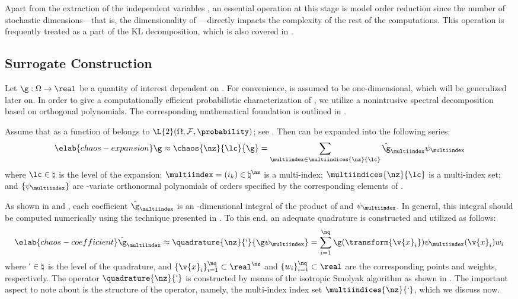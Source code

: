 Apart from the extraction of the independent variables \vz, an essential
operation at this stage is model order reduction since the number of stochastic
dimensions---that is, the dimensionality of \vz---directly impacts the
complexity of the rest of the computations. This operation is frequently treated
as a part of the \ac{KL} decomposition, which is also covered in
.

\subsection{Surrogate Construction}

Let $\g: \Omega \to \real$ be a quantity of interest dependent on \vu. For
convenience, \g is assumed to be one-dimensional, which will be generalized
later on. In order to give a computationally efficient probabilistic
characterization of \g, we utilize a nonintrusive spectral decomposition based
on orthogonal polynomials. The corresponding mathematical foundation is outlined
in .

Assume that \g as a function of \vu belongs to $\L{2}(\Omega, \mathcal{F},
\probability)$; see . Then \g can be expanded into the
following series:
\begin{equation} \elab{chaos-expansion}
  \g \approx \chaos{\nz}{\lc}{\g} = \sum_{\multiindex \in \multiindices{\nz}{\lc}} \hat{\g}_{\multiindex} \psi_{\multiindex}
\end{equation}
where $\lc \in \natural$ is the level of the expansion; $\multiindex = (i_k) \in
\natural^\nz$ is a multi-index; $\multiindices{\nz}{\lc}$ is a multi-index set;
and $\{ \psi_{\multiindex} \}$ are \nz-variate orthonormal polynomials of orders
specified by the corresponding elements of \multiindex.

As shown in  and , each
coefficient $\hat{\g}_{\multiindex}$ is an \nz-dimensional integral of the
product of \g and $\psi_{\multiindex}$. In general, this integral should be
computed numerically using the technique presented in
. To this end, an adequate quadrature is constructed
and utilized as follows:
\begin{equation} \elab{chaos-coefficient}
  \hat{\g}_{\multiindex} \approx \quadrature{\nz}{\lq}{\g \psi_{\multiindex}} = \sum_{i = 1}^\nq \g(\transform{\v{x}_i}) \psi_{\multiindex}(\v{x}_i) w_i
\end{equation}
where $\lq \in \natural$ is the level of the quadrature, and $\{ \v{x}_i \}_{i =
1}^\nq \subset \real^\nz$ and $\{ w_i \}_{i = 1}^\nq \subset \real$ are the
corresponding points and weights, respectively. The operator
$\quadrature{\nz}{\lq}$ is constructed by means of the isotropic Smolyak
algorithm \cite{smolyak1963} as shown in . The
important aspect to note about  is the structure of
the operator, namely, the multi-index index set $\multiindices{\nz}{\lq}$, which
we discuss now.

